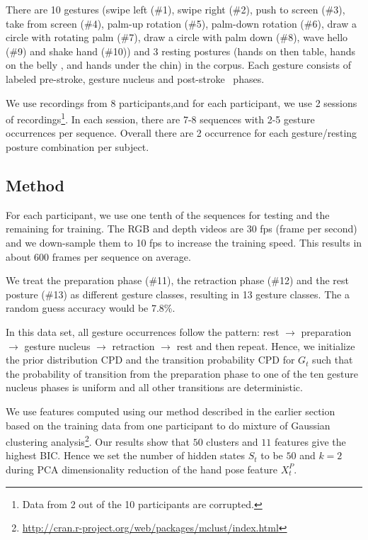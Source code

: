\documentclass{sigchi}
\begin{document}
There are 10 gestures (swipe left (\#1), swipe right (\#2), push to screen
(\#3), take from screen (\#4), palm-up rotation (\#5), palm-down rotation (\#6),
draw a circle with rotating palm (\#7), draw a circle with palm down (\#8), wave
hello (\#9) and shake hand (\#10)) and 3 resting postures (hands on then table,
hands on the belly , and hands under the chin) in the corpus.
Each gesture consists of labeled pre-stroke, gesture nucleus and
post-stroke~\cite{Pavlovic97} phases.

We use recordings from 8 participants,and for each participant, we use 2 sessions
of recordings\footnote{Data from 2 out of the 10 participants are corrupted.}.
In each session, there are 7-8 sequences with 2-5 gesture occurrences per
sequence. Overall there are 2 occurrence for each gesture/resting posture combination per subject.

\subsection{Method}
For each participant, we use
one tenth of the sequences for testing and the remaining for training. 
The RGB and depth videos are 30 fps (frame per second) and we down-sample them
to 10 fps to increase the training speed. This results in about 600 frames per sequence on average.

We treat the preparation phase (\#11), the retraction phase (\#12) and the rest posture (\#13) 
as different gesture classes, resulting
in 13 gesture classes. The a random guess accuracy would be
7.8\%.


In this data set, all gesture occurrences follow the pattern: rest $\rightarrow$ preparation
$\rightarrow$ gesture nucleus $\rightarrow$ retraction $\rightarrow$ rest and then repeat. 
Hence, we initialize the prior distribution CPD
and the transition probability CPD for $G_t$ such that the probability of transition from the preparation phase
to one of the ten gesture nucleus phases is uniform and all other transitions are deterministic.

We use features computed using our method described in the earlier section based
on the training data from one participant to do mixture of Gaussian clustering analysis\footnote{\url{http://cran.r-project.org/web/packages/mclust/index.html}}. 
Our results show that $50$ clusters and
$11$ features give the highest BIC. Hence we set the 
number of hidden states $S_t$ to be $50$ and $k = 2$
during PCA dimensionality reduction of the hand pose feature $X_t^P$.
\end{document}
